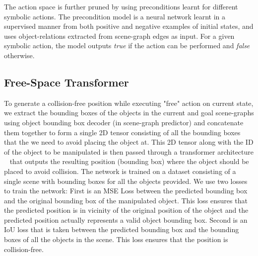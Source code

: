 The action space is further pruned by using preconditions learnt for different symbolic actions. The precondition model is a neural network learnt in a supervised manner from both positive and negative examples of initial states, and uses object-relations extracted from scene-graph edges as input. For a given symbolic action, the model outputs \textit{true} if the action can be performed and \textit{false} otherwise.

\subsection{Free-Space Transformer}
To generate a collision-free position while executing "free" action on current state, we extract the bounding boxes of the objects in the current and goal scene-graphs using object bounding box decoder (in scene-graph predictor) and concatenate them together to form a single 2D tensor consisting of all the bounding boxes that the we need to avoid placing the object at. This 2D tensor along with the ID of the object to be manipulated is then passed through a transformer architecture ~\cite{Vaswani2017AttentionIA} that outputs the resulting position (bounding box) where the object should be placed to avoid collision. The network is trained on a dataset consisting of a single scene with bounding boxes for all the objects provided. We use two losses to train the network: First is an MSE Loss between the predicted bounding box and the original bounding box of the manipulated object. This loss ensures that the predicted position is in vicinity of the original position of the object and the predicted position actually represents a valid object bounding box. Second is an IoU loss that is taken between the predicted bounding box and the bounding boxes of all the objects in the scene. This loss ensures that the position is collision-free.

